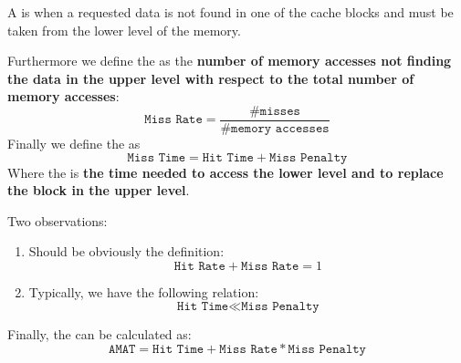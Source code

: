\begin{definitionbox}\label{definition: Cache Miss}
    A  is when a requested data is not found in one of the cache blocks and must be taken from the lower level of the memory.
\end{definitionbox}

\noindent
Furthermore we define the  as the \textbf{number of memory accesses not finding the data in the upper level with respect to the total number of memory accesses}:
\begin{equation}\label{eq: Miss Rate}
    \texttt{Miss Rate} = \dfrac{\texttt{\# misses}}{\texttt{\# memory accesses}}
\end{equation}
Finally we define the  as
\begin{equation}\label{eq: Miss Time}
    \texttt{Miss Time} = \texttt{Hit Time} + \texttt{Miss Penalty}
\end{equation}
Where the  is \textbf{the time needed to access the lower level and to replace the block in the upper level}.

\highspace
Two observations:
\begin{enumerate}
    \item Should be obviously the definition:
    \begin{equation*}
        \texttt{Hit Rate} + \texttt{Miss Rate} = 1
    \end{equation*}

    \item Typically, we have the following relation:
    \begin{equation*}
        \texttt{Hit Time} \ll \texttt{Miss Penalty}
    \end{equation*}
\end{enumerate}
Finally, the  can be calculated as:
\begin{equation}\label{eq: Average Memory Access Time (AMAT)}
    \texttt{AMAT} = \texttt{Hit Time} + \texttt{Miss Rate} * \texttt{Miss Penalty}
\end{equation}